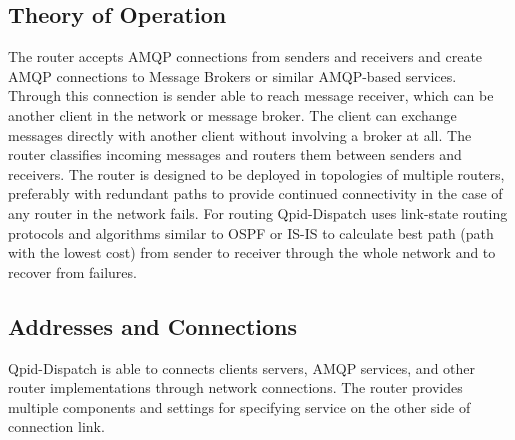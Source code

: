 
\subsection{Theory of Operation}
The router accepts AMQP connections from senders and receivers and create AMQP connections to Message Brokers or similar AMQP-based services. Through this connection is sender able to reach message receiver, which can be another client in the network or message broker. The client can exchange messages directly with another client without involving a broker at all. The router classifies incoming messages and routers them between senders and receivers. The router is designed to be deployed in topologies of multiple routers, preferably with redundant paths to provide continued connectivity in the case of any router in the network fails. For routing Qpid-Dispatch uses link-state routing protocols\footnotemark{} and algorithms similar to OSPF or IS-IS to calculate best path (path with the lowest cost) from sender to receiver through the whole network and to recover from failures.


\subsection{Addresses and Connections}
\label{Addresses and Connections}
Qpid-Dispatch is able to connects clients servers, AMQP services, and other router implementations through network connections. The router provides multiple components and settings for specifying service on the other side of connection link.

